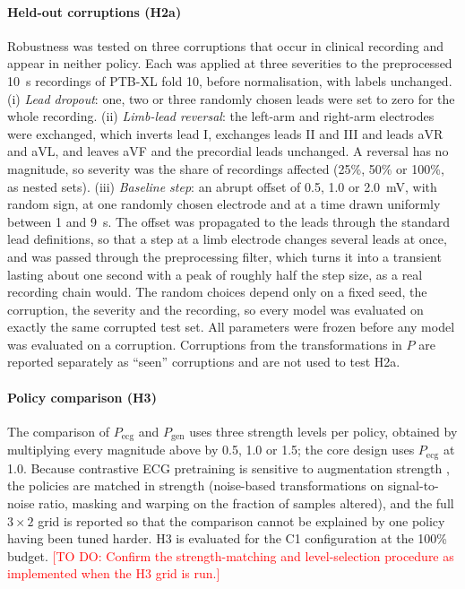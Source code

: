 \documentclass[preprint,12pt]{elsarticle}
\newcommand{\todo}[1]{\textcolor{red}{[TO DO: #1]}}
\begin{document}
\paragraph{Held-out corruptions (H2a)} Robustness was tested on three corruptions that occur in clinical recording \cite{moody1984,batchvarov2007} and appear in neither policy. Each was applied at three severities to the preprocessed 10~s recordings of PTB-XL fold 10, before normalisation, with labels unchanged. (i) \emph{Lead dropout}: one, two or three randomly chosen leads were set to zero for the whole recording. (ii) \emph{Limb-lead reversal}: the left-arm and right-arm electrodes were exchanged, which inverts lead I, exchanges leads II and III and leads aVR and aVL, and leaves aVF and the precordial leads unchanged. A reversal has no magnitude, so severity was the share of recordings affected (25\%, 50\% or 100\%, as nested sets). (iii) \emph{Baseline step}: an abrupt offset of 0.5, 1.0 or 2.0~mV, with random sign, at one randomly chosen electrode and at a time drawn uniformly between 1 and 9~s. The offset was propagated to the leads through the standard lead definitions, so that a step at a limb electrode changes several leads at once, and was passed through the preprocessing filter, which turns it into a transient lasting about one second with a peak of roughly half the step size, as a real recording chain would. The random choices depend only on a fixed seed, the corruption, the severity and the recording, so every model was evaluated on exactly the same corrupted test set. All parameters were frozen before any model was evaluated on a corruption. Corruptions from the transformations in $P$ are reported separately as ``seen'' corruptions and are not used to test H2a.

\paragraph{Policy comparison (H3)} The comparison of $P_{\text{ecg}}$ and $P_{\text{gen}}$ uses three strength levels per policy, obtained by multiplying every magnitude above by 0.5, 1.0 or 1.5; the core design uses $P_{\text{ecg}}$ at 1.0. Because contrastive ECG pretraining is sensitive to augmentation strength \cite{soltanieh2022aug}, the policies are matched in strength (noise-based transformations on signal-to-noise ratio, masking and warping on the fraction of samples altered), and the full $3\times2$ grid is reported so that the comparison cannot be explained by one policy having been tuned harder. H3 is evaluated for the C1 configuration at the 100\% budget. \todo{Confirm the strength-matching and level-selection procedure as implemented when the H3 grid is run.}
\end{document}
